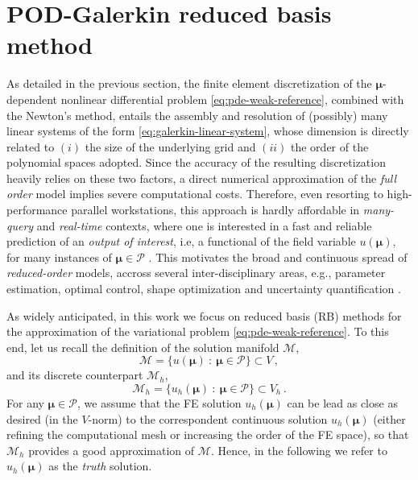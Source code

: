 \documentclass[12pt, a4paper, twoside, openright]{report}
\numberwithin{equation}{chapter}
\theoremstyle{theorem}
\theoremstyle{definition}
\theoremstyle{remark}
\theoremstyle{proposition}
\numberwithin{figure}{chapter}
\newcommand{\bg}[1]{\boldsymbol{#1}}
\begin{document}
	\vspace*{0.3cm}
		
	\section{POD-Galerkin reduced basis method}
	\label{section:POD-Galerkin reduced basis method}
		
		As detailed in the previous section, the finite element discretization of the $\bg{\mu}$-dependent nonlinear differential problem \eqref{eq:pde-weak-reference}, combined with the Newton's method, entails the assembly and resolution of (possibly) many linear systems of the form \eqref{eq:galerkin-linear-system}, whose dimension is directly related to $(i)$ the size of the underlying grid and $(ii)$ the order of the polynomial spaces adopted. Since the accuracy of the resulting discretization heavily relies on these two factors, a direct numerical approximation of the \emph{full order} model implies severe computational costs. Therefore, even resorting to high-performance parallel workstations, this approach is hardly affordable in \emph{many-query} and \emph{real-time} contexts, where one is interested in a fast and reliable prediction of an \emph{output of interest}, i.e, a functional of the field variable $u(\bg{\mu})$, for many instances of $\bg{\mu} \in \mathcal{P}$ \cite{Dep08}. This motivates the broad and continuous spread of \emph{reduced-order} models, accross several inter-disciplinary areas, e.g., parameter estimation, optimal control, shape optimization and uncertainty quantification \cite{HSR16, QMN15}. 
		
		As widely anticipated, in this work we focus on reduced basis (RB) methods for the approximation of the variational problem \eqref{eq:pde-weak-reference}. To this end, let us recall the definition of the solution manifold $\mathcal{M}$,
		\begin{equation*}
			\mathcal{M} = \big\lbrace u(\bg{\mu}) ~ : ~ \bg{\mu} \in \mathcal{P} \big\rbrace \subset V \, ,
		\end{equation*}
		and its discrete counterpart $\mathcal{M}_h$,
		\begin{equation*}
			\mathcal{M}_h = \big\lbrace u_h(\bg{\mu}) ~ : ~ \bg{\mu} \in \mathcal{P} \big\rbrace \subset V_h \, .
		\end{equation*}
		For any $\bg{\mu} \in \mathcal{P}$, we assume that the FE solution $u_h(\bg{\mu})$ can be lead as close as desired (in the $V$-norm) to the correspondent continuous solution $u_h(\bg{\mu})$ (either refining the computational mesh or increasing the order of the FE space), so that $\mathcal{M}_h$ provides a good approximation of $\mathcal{M}$. Hence, in the following we refer to $u_h(\bg{\mu})$ as the \emph{truth} solution.
		
\end{document}
